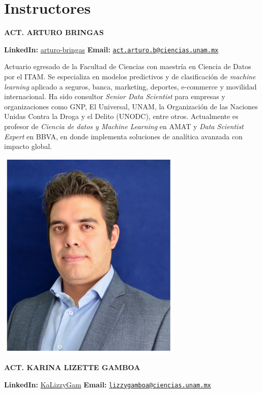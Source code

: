 \documentclass[
]{book}
\begin{document}
\hypertarget{instructores}{%
\section*{Instructores}\label{instructores}}

\textbf{ACT. ARTURO BRINGAS}

\textbf{LinkedIn:} \href{https://www.linkedin.com/in/arturo-bringas/}{arturo-bringas}
\textbf{Email:} \href{mailto:act.arturo.b@ciencias.unam.mx}{\nolinkurl{act.arturo.b@ciencias.unam.mx}}

Actuario egresado de la Facultad de Ciencias con maestría en Ciencia de Datos por el ITAM.
Se especializa en modelos predictivos y de clasificación de \emph{machine learning} aplicado a seguros, banca, marketing, deportes, e-commerce y movilidad internacional. Ha sido consultor \emph{Senior Data Scientist} para empresas y organizaciones como GNP, El Universal, UNAM, la Organización de las Naciones Unidas Contra la Droga y el Delito (UNODC), entre otros. Actualmente es profesor de \emph{Ciencia de datos y Machine Learning} en AMAT y \emph{Data Scientist Expert} en BBVA, en donde implementa soluciones de analítica avanzada con impacto global.

\begin{center}\includegraphics[width=250pt]{img/00-presentacion/arturo} \end{center}

\textbf{ACT. KARINA LIZETTE GAMBOA}

\textbf{LinkedIn:} \href{https://www.linkedin.com/in/kalizzygam/}{KaLizzyGam}
\textbf{Email:} \href{mailto:lizzygamboa@ciencias.unam.mx}{\nolinkurl{lizzygamboa@ciencias.unam.mx}}
\end{document}
